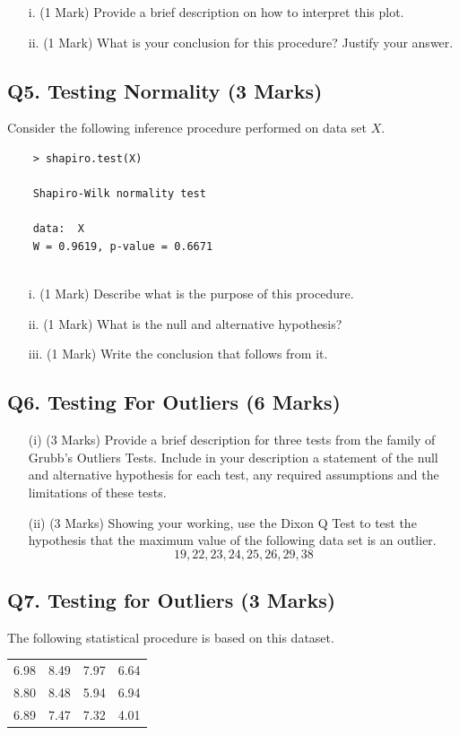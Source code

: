 \documentclass[a4paper,12pt]{article}
\begin{document}
\begin{itemize}
	\item[i.] (1 Mark) Provide a brief description on how to interpret this plot.
	\item[ii.] (1 Mark) What is your conclusion for this procedure? Justify your answer.
\end{itemize}
\newpage
\subsection*{Q5. Testing Normality (3 Marks)} %
Consider the following inference procedure performed on data set $X$.
\begin{center}
	\begin{verbatim}
	> shapiro.test(X)
	
	Shapiro-Wilk normality test
	
	data:  X
	W = 0.9619, p-value = 0.6671
	
	\end{verbatim}
\end{center}


\begin{itemize}
	\item[i.] (1 Mark) Describe what is the purpose of this procedure.
	\item[ii.] (1 Mark) What is the null and alternative hypothesis?
	\item[iii.] (1 Mark) Write the conclusion that follows from it.
\end{itemize}

\subsection*{Q6. Testing For Outliers (6 Marks)}
\begin{itemize}
	\item[(i)] (3 Marks) Provide a brief description for three tests from the family of Grubb's  Outliers Tests. Include in your description a statement of the null and alternative hypothesis for each test, any required assumptions and the limitations of these tests.
	\item[(ii)] (3 Marks) Showing your working, use the Dixon Q Test to test the hypothesis that the maximum value of the following data set is an outlier.
	\[ 19,22,23,24,25,26,29,38\]
\end{itemize}

\newpage
\subsection*{Q7. Testing for Outliers (3 Marks)} %
The following statistical procedure is based on this dataset.
\begin{center}
\begin{tabular}{|cccc|}
	\hline
	6.98 &8.49 &7.97& 6.64\\
	8.80 &8.48 &5.94& 6.94\\
	6.89 &7.47 &7.32& 4.01\\
	\hline
\end{tabular}
\end{center}
\end{document}
